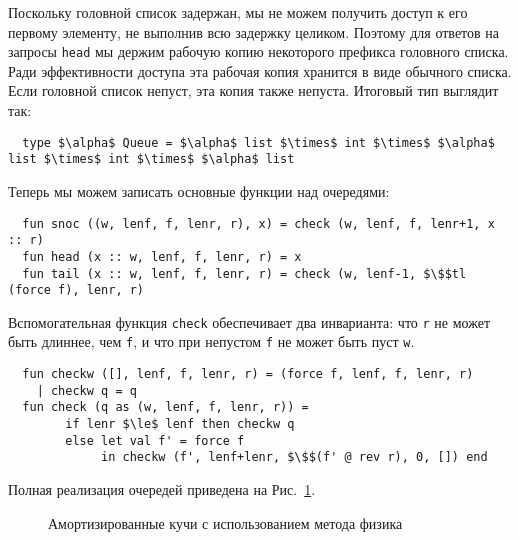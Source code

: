 Поскольку головной список задержан, мы не можем получить доступ к его
первому элементу, не выполнив всю задержку целиком.  Поэтому для
ответов на запросы \lstinline!head! мы держим рабочую копию некоторого
префикса головного списка. Ради эффективности доступа эта рабочая
копия хранится в виде обычного списка. Если головной список непуст,
эта копия также непуста. Итоговый тип выглядит так:
\begin{lstlisting}
  type $\alpha$ Queue = $\alpha$ list $\times$ int $\times$ $\alpha$ list $\times$ int $\times$ $\alpha$ list
\end{lstlisting}
Теперь мы можем записать основные функции над очередями:
\begin{lstlisting}
  fun snoc ((w, lenf, f, lenr, r), x) = check (w, lenf, f, lenr+1, x :: r)
  fun head (x :: w, lenf, f, lenr, r) = x
  fun tail (x :: w, lenf, f, lenr, r) = check (w, lenf-1, $\$$tl (force f), lenr, r)
\end{lstlisting}
Вспомогательная функция \lstinline!check! обеспечивает два инварианта:
что \lstinline!r! не может быть длиннее, чем \lstinline!f!, и что при
непустом \lstinline!f! не может быть пуст \lstinline!w!.
\begin{lstlisting}
  fun checkw ([], lenf, f, lenr, r) = (force f, lenf, f, lenr, r)
    | checkw q = q
  fun check (q as (w, lenf, f, lenr, r)) =
        if lenr $\le$ lenf then checkw q
        else let val f' = force f
             in checkw (f', lenf+lenr, $\$$(f' @ rev r), 0, []) end
\end{lstlisting}
Полная реализация очередей приведена на Рис.~\ref{fig:6.3}.

\begin{figure}
  \centering
  
  \caption{Амортизированные кучи с использованием метода физика}
  \label{fig:6.3}
\end{figure}

